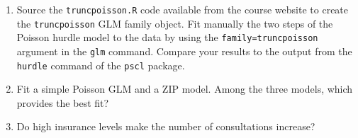 \documentclass[a4paper,12pt]{article}
\begin{document}


\begin{enumerate}
\item{Source the \texttt{truncpoisson.R} code available from the course website to create the \texttt{truncpoisson} GLM family object. Fit manually the two steps of the Poisson hurdle model to the data by using the \texttt{family=truncpoisson} argument in the \verb"glm" command. Compare your results to the output from the \texttt{hurdle} command of the \texttt{pscl} package.}
\item{Fit a simple Poisson GLM and a ZIP model. Among the three models, which provides the best fit?}
\item{Do high insurance levels make the number of consultations increase?}
\end{enumerate}
\end{document}
